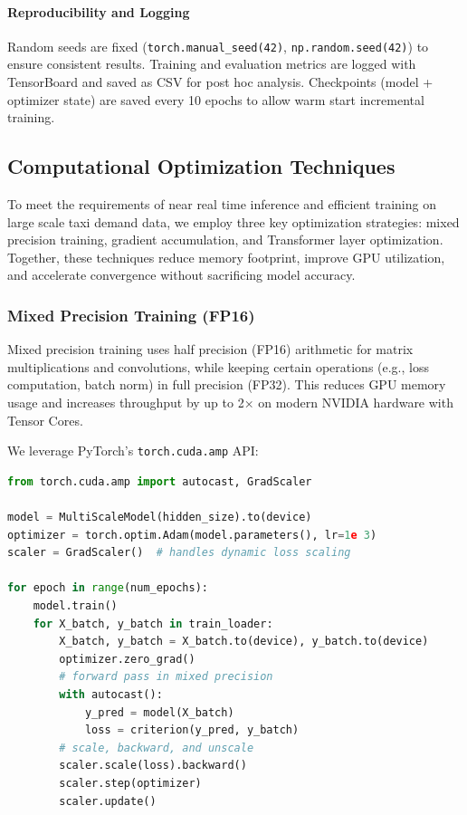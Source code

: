 \documentclass{article}
\begin{document}
\paragraph{Reproducibility and Logging}  
Random seeds are fixed (\texttt{torch.manual\_seed(42)}, \texttt{np.random.seed(42)}) to ensure consistent results. Training and evaluation metrics are logged with TensorBoard and saved as CSV for post hoc analysis. Checkpoints (model + optimizer state) are saved every 10 epochs to allow warm start incremental training.

\subsection{Computational Optimization Techniques}

To meet the requirements of near real time inference and efficient training on large scale taxi demand data, we employ three key optimization strategies: mixed precision training, gradient accumulation, and Transformer layer optimization. Together, these techniques reduce memory footprint, improve GPU utilization, and accelerate convergence without sacrificing model accuracy.

\subsubsection{Mixed Precision Training (FP16)}

Mixed precision training uses half precision (FP16) arithmetic for matrix multiplications and convolutions, while keeping certain operations (e.g., loss computation, batch norm) in full precision (FP32). This reduces GPU memory usage and increases throughput by up to 2× on modern NVIDIA hardware with Tensor Cores.

We leverage PyTorch’s \texttt{torch.cuda.amp} API:

\begin{lstlisting}[language=Python, caption={Mixed Precision Training Boilerplate}]
from torch.cuda.amp import autocast, GradScaler

model = MultiScaleModel(hidden_size).to(device)
optimizer = torch.optim.Adam(model.parameters(), lr=1e 3)
scaler = GradScaler()  # handles dynamic loss scaling

for epoch in range(num_epochs):
    model.train()
    for X_batch, y_batch in train_loader:
        X_batch, y_batch = X_batch.to(device), y_batch.to(device)
        optimizer.zero_grad()
        # forward pass in mixed precision
        with autocast():
            y_pred = model(X_batch)
            loss = criterion(y_pred, y_batch)
        # scale, backward, and unscale
        scaler.scale(loss).backward()
        scaler.step(optimizer)
        scaler.update()
\end{lstlisting}
\end{document}
